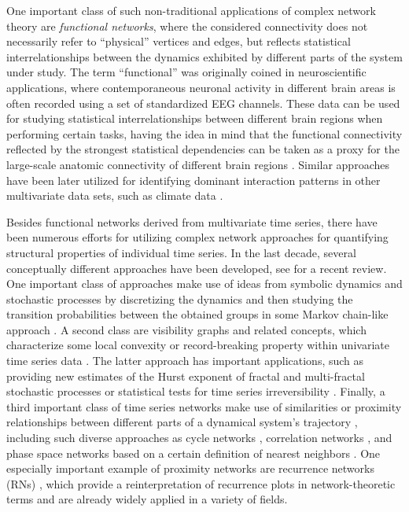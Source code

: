 \documentclass[graybox]{svmult}
\begin{document}
One important class of such non-traditional applications of complex network theory are \emph{functional networks}, where the considered connectivity does not necessarily refer to ``physical'' vertices and edges, but reflects statistical interrelationships between the dynamics exhibited by different parts of the system under study. The term ``functional'' was originally coined in neuroscientific applications, where contemporaneous neuronal activity in different brain areas is often recorded using a set of standardized EEG channels. These data can be used for studying statistical interrelationships between different brain regions when performing certain tasks, having the idea in mind that the functional connectivity reflected by the strongest statistical dependencies can be taken as a proxy for the large-scale anatomic connectivity of different brain regions \cite{Zhou2006,Zhou2007}. Similar approaches have been later utilized for identifying dominant interaction patterns in other multivariate data sets, such as climate data \cite{Donges2009b,Donges2009a,Tsonis2004}.

Besides functional networks derived from multivariate time series, there have been numerous efforts for utilizing complex network approaches for quantifying structural properties of individual time series. In the last decade, several conceptually different approaches have been developed, see \cite{Donner2011IJBC} for a recent review. One important class of approaches make use of ideas from symbolic dynamics and stochastic processes by discretizing the dynamics and then studying the transition probabilities between the obtained groups in some Markov chain-like approach \cite{Nicolis2005}. A second class are visibility graphs and related concepts, which characterize some local convexity or record-breaking property within univariate time series data \cite{Donner2012AG,Lacasa2008,Luque2009}. The latter approach has important applications, such as providing new estimates of the Hurst exponent of fractal and multi-fractal stochastic processes \cite{Lacasa2009,Ni2009} or statistical tests for time series irreversibility \cite{Donges2013EPL,Lacasa2012}. Finally, a third important class of time series networks make use of similarities or proximity relationships between different parts of a dynamical system's trajectory \cite{Donner2011IJBC}, including such diverse approaches as cycle networks \cite{Zhang2006}, correlation networks \cite{Yang2008}, and phase space networks based on a certain definition of nearest neighbors \cite{Xu2008}. One especially important example of proximity networks are recurrence networks (RNs) \cite{Donner2010PRE,Donner2010NJP,Marwan2009}, which provide a reinterpretation of recurrence plots in network-theoretic terms and are already widely applied in a variety of fields.
\end{document}
